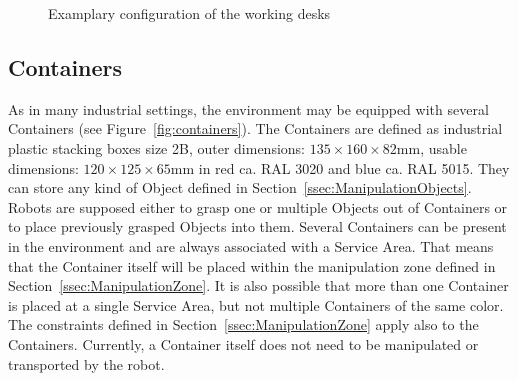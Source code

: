 \begin{figure}[h!]
	\begin{center}
		\hspace{.05\textwidth}
	\end{center}
	\caption{Examplary configuration of the working desks}
	\label{fig:ast_example}
\end{figure}



\subsection{Containers}
As in many industrial settings, the \RCAW environment may be equipped with several Containers (see Figure~\ref{fig:containers}). The Containers are defined as industrial plastic stacking boxes size 2B, outer dimensions: $135 \times 160 \times 82  \si{\milli\meter}$, usable dimensions: $120 \times 125 \times 65  \si{\milli\meter}$  in red ca. RAL 3020 and blue ca. RAL 5015.
They can store any kind of Object defined in Section~\ref{ssec:ManipulationObjects}. Robots are supposed either to grasp one or multiple Objects out of Containers or to place previously grasped Objects into them. Several Containers can be present in the environment and are always associated with a Service Area. That means that the Container itself will be placed within the manipulation zone defined in Section~\ref{ssec:ManipulationZone}.
It is also possible that more than one Container is placed at a single Service Area, but not multiple Containers of the same color.
The constraints defined in Section~\ref{ssec:ManipulationZone} apply also to the Containers.
Currently, a Container itself does not need to be manipulated or transported by the robot.

